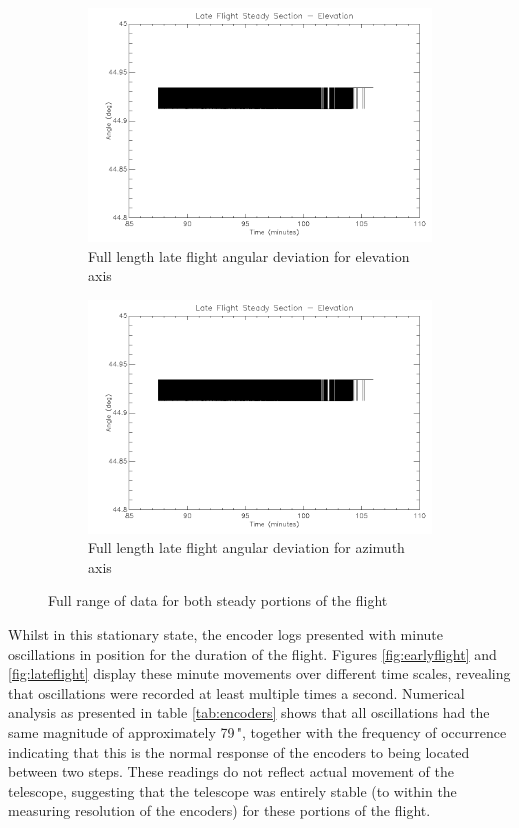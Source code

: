 \begin{figure}[h!]
\begin{subfigure}{0.45\textwidth}
		\includegraphics[width=1\linewidth]{appendix/img/campaign_results/latealt.png}
		\caption{Full length late flight angular deviation for elevation axis}
		\label{fig:sub:latealt}
	\end{subfigure}
	\begin{subfigure}{0.45\textwidth}
		\includegraphics[width=1\linewidth]{appendix/img/campaign_results/latealt.png}
		\caption{Full length late flight angular deviation for azimuth axis}
		\label{fig:sub:lateaz}
	\end{subfigure}
	\caption{Full range of data for both steady portions of the flight}
	\label{fig:fullsteady}
\end{figure}

Whilst in this stationary state, the encoder logs presented with minute oscillations in position for the duration of the flight. Figures \ref{fig:earlyflight} and \ref{fig:lateflight} display these minute movements over different time scales, revealing that oscillations were recorded at least multiple times a second. Numerical analysis as presented in table \ref{tab:encoders} shows that all oscillations had the same magnitude of approximately 79\,", together with the frequency of occurrence indicating that this is the normal response of the encoders to being located between two steps. These readings do not reflect actual movement of the telescope, suggesting that the telescope was entirely stable (to within the measuring resolution of the encoders) for these portions of the flight. 

